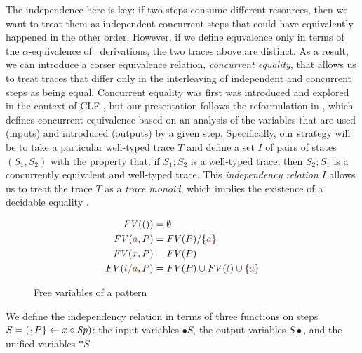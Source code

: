 The independence here is key: if two steps consume different
resources, then we want to treat them as independent concurrent steps
that could have equivalently happened in the other order. However, if
we define equvalence only in terms of the $\alpha$-equivalence of
\ollll~derivations, the two traces above are distinct. As a result, we
can introduce a corser equivalence relation, {\it concurrent
  equality}, that allows us to treat traces that differ only in the
interleaving of independent and concurrent steps as being equal.
Concurrent equality was first was introduced and explored in the
context of CLF \cite{watkins02concurrent}, but our presentation
follows the reformulation in \cite{cervesato12trace}, which defines
concurrent equivalence based on an analysis of the variables that are
used (inputs) and introduced (outputs) by a given step.  Specifically,
our strategy will be to take a particular well-typed trace $T$ and
define a set $I$ of pairs of states $(S_1, S_2)$ with the property
that, if $S_1; S_2$ is a well-typed trace, then $S_2; S_1$ is a
concurrently equivalent and well-typed trace.  This {\it independency
  relation} $I$ allows us to treat the trace $T$ as a {\it trace
  monoid}, which implies the existence of a decidable equality
\cite{diekert90combinatorics}.

\begin{figure}
\begin{align*}
{\it FV}(()) & = \emptyset
\\
{\it FV}(\lf{a}, P) & = {\it FV}(P)/\{\lf{a}\} 
\\
{\it FV}(x, P) & = {\it FV}(P)
\\
{\it FV}(\lf{t/a}, P) & =  {\it FV}(P) \cup {\it FV}(\lf{t}) \cup \{ \lf{a} \}
\end{align*}
\caption{Free variables of a pattern}
\label{fig:freevarspat}
\end{figure}

We define the independency relation in terms of three functions on
steps $S = (\{{P}\} \leftarrow {x} \circ {{\it Sp}})$: the input variables ${\bullet}S$,
the output variables $S{\bullet}$, and the unified variables
${\ast}S$. 

